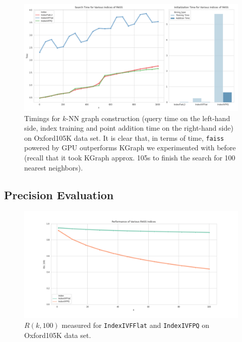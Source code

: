 \begin{frame}

\begin{figure}
\centering
\includegraphics[width=0.85\linewidth,height=0.65\textheight]{../images/knn/timings}
\caption{Timings for $k$-NN graph construction (query time on the left-hand side, index training and point addition time on the right-hand side) on Oxford105K data set. It is clear that, in terms of time, \texttt{faiss} powered by GPU outperforms KGraph \cite{Dong2011} we experimented with before (recall that it took KGraph approx. 105s to finish the search for 100 nearest neighbors).}
\end{figure}
	
\end{frame}


\subsection{Precision Evaluation}


\begin{frame}

\begin{figure}
\centering
\includegraphics[width=0.85\linewidth,height=0.65\textheight]{../images/knn/precision}
\caption{$R(k, 100)$ measured for \texttt{IndexIVFFlat} and \texttt{IndexIVFPQ} on Oxford105K data set.}
\label{fig:knn_precision}
\end{figure}
	
\end{frame}


